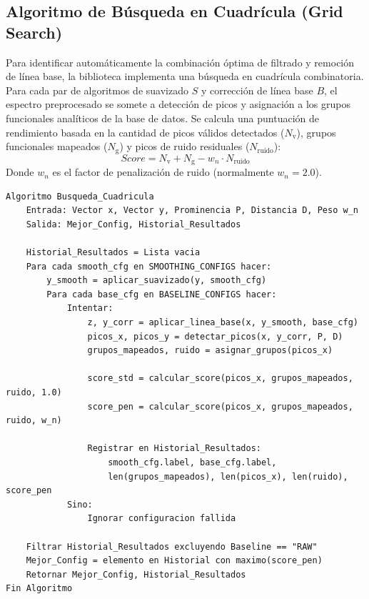 \documentclass[a4paper,11pt]{article}
\begin{document}
\subsection{Algoritmo de Búsqueda en Cuadrícula (Grid Search)}
Para identificar automáticamente la combinación óptima de filtrado y remoción de línea base, la biblioteca implementa una búsqueda en cuadrícula combinatoria. Para cada par de algoritmos de suavizado $S$ y corrección de línea base $B$, el espectro preprocesado se somete a detección de picos y asignación a los grupos funcionales analíticos de la base de datos. Se calcula una puntuación de rendimiento basada en la cantidad de picos válidos detectados ($N_{\text{v}}$), grupos funcionales mapeados ($N_{\text{g}}$) y picos de ruido residuales ($N_{\text{ruido}}$):
\begin{equation}
    Score = N_{\text{v}} + N_{\text{g}} - w_n \cdot N_{\text{ruido}}
\end{equation}
Donde $w_n$ es el factor de penalización de ruido (normalmente $w_n = 2.0$). 

\begin{lstlisting}[caption=Algoritmo Modular Combinatorio de Búsqueda en Cuadrícula]
Algoritmo Busqueda_Cuadricula
    Entrada: Vector x, Vector y, Prominencia P, Distancia D, Peso w_n
    Salida: Mejor_Config, Historial_Resultados

    Historial_Resultados = Lista vacia
    Para cada smooth_cfg en SMOOTHING_CONFIGS hacer:
        y_smooth = aplicar_suavizado(y, smooth_cfg)
        Para cada base_cfg en BASELINE_CONFIGS hacer:
            Intentar:
                z, y_corr = aplicar_linea_base(x, y_smooth, base_cfg)
                picos_x, picos_y = detectar_picos(x, y_corr, P, D)
                grupos_mapeados, ruido = asignar_grupos(picos_x)
                
                score_std = calcular_score(picos_x, grupos_mapeados, ruido, 1.0)
                score_pen = calcular_score(picos_x, grupos_mapeados, ruido, w_n)
                
                Registrar en Historial_Resultados:
                    smooth_cfg.label, base_cfg.label,
                    len(grupos_mapeados), len(picos_x), len(ruido), score_pen
            Sino:
                Ignorar configuracion fallida
                
    Filtrar Historial_Resultados excluyendo Baseline == "RAW"
    Mejor_Config = elemento en Historial con maximo(score_pen)
    Retornar Mejor_Config, Historial_Resultados
Fin Algoritmo
\end{lstlisting}
\end{document}
